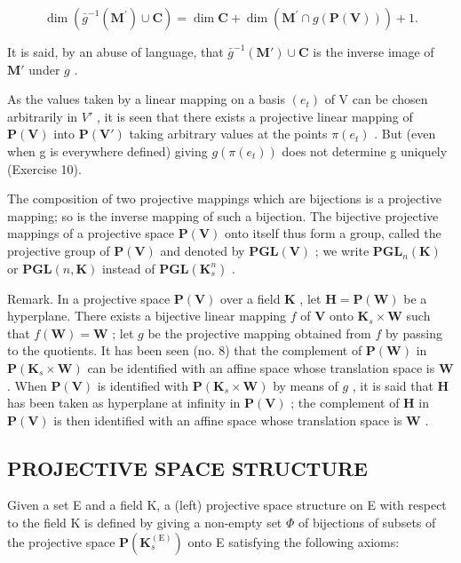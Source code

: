 \[
\dim (\bar {g} ^ {- 1} (\mathbf {M} ^ {\prime}) \cup \mathbf {C}) = \dim \mathbf {C} + \dim (\mathbf {M} ^ {\prime} \cap g (\mathbf {P} (\mathbf {V}))) + 1.\tag{8}
\]

It is said, by an abuse of language, that \(\bar{g}^{-1}(\mathbf{M}') \cup \mathbf{C}\) is the inverse image of \(\mathbf{M}'\) under \(g\) .

As the values taken by a linear mapping on a basis \((e_{t})\) of V can be chosen arbitrarily in \(V'\) , it is seen that there exists a projective linear mapping of \(\mathbf{P}(\mathbf{V})\) into \(\mathbf{P}(\mathbf{V}')\) taking arbitrary values at the points \(\pi(e_{t})\) . But (even when g is everywhere defined) giving \(g(\pi(e_{t}))\) does not determine g uniquely (Exercise 10).

The composition of two projective mappings which are bijections is a projective mapping; so is the inverse mapping of such a bijection. The bijective projective mappings of a projective space \(\mathbf{P}(\mathbf{V})\) onto itself thus form a group, called the projective group of \(\mathbf{P}(\mathbf{V})\) and denoted by \(\mathbf{PGL}(\mathbf{V})\) ; we write \(\mathbf{PGL}_{n}(\mathbf{K})\) or \(\mathbf{PGL}(n,\mathbf{K})\) instead of \(\mathbf{PGL}(\mathbf{K}_{s}^{n})\) .

Remark. In a projective space \(\mathbf{P}(\mathbf{V})\) over a field \(\mathbf{K}\) , let \(\mathbf{H} = \mathbf{P}(\mathbf{W})\) be a hyperplane. There exists a bijective linear mapping \(f\) of \(\mathbf{V}\) onto \(\mathbf{K}_s \times \mathbf{W}\) such that \(f(\mathbf{W}) = \mathbf{W}\) ; let \(g\) be the projective mapping obtained from \(f\) by passing to the quotients. It has been seen (no. 8) that the complement of \(\mathbf{P}(\mathbf{W})\) in \(\mathbf{P}(\mathbf{K}_s \times \mathbf{W})\) can be identified with an affine space whose translation space is \(\mathbf{W}\) . When \(\mathbf{P}(\mathbf{V})\) is identified with \(\mathbf{P}(\mathbf{K}_s \times \mathbf{W})\) by means of \(g\) , it is said that \(\mathbf{H}\) has been taken as hyperplane at infinity in \(\mathbf{P}(\mathbf{V})\) ; the complement of \(\mathbf{H}\) in \(\mathbf{P}(\mathbf{V})\) is then identified with an affine space whose translation space is \(\mathbf{W}\) .

\subsection{PROJECTIVE SPACE STRUCTURE}

Given a set E and a field K, a (left) projective space structure on E with respect to the field K is defined by giving a non-empty set \(\Phi\) of bijections of subsets of the projective space \(\mathbf{P}(\mathbf{K}_{s}^{\mathrm{(E)}})\) onto E satisfying the following axioms:


